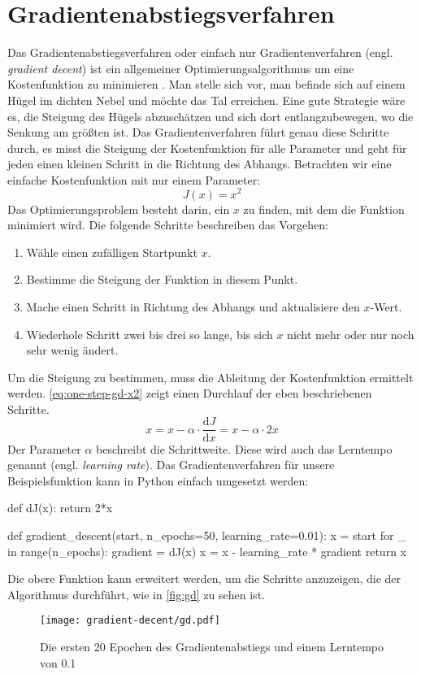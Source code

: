 \chapter{Gradientenabstiegsverfahren}
\label{appx:gradient-descent}
Das Gradientenabstiegsverfahren oder einfach nur Gradientenverfahren
(engl. \textit{gradient decent})
ist ein allgemeiner Optimierungsalgorithmus
um eine Kostenfunktion zu minimieren \parencite[118]{book:hands-on-ml}.
Man stelle sich vor, man befinde sich auf einem Hügel im dichten Nebel
und möchte das Tal erreichen.
Eine gute Strategie wäre es, die Steigung des
Hügels abzuschätzen und sich dort entlangzubewegen,
wo die Senkung am größten ist.
Das Gradientenverfahren führt genau diese Schritte durch,
es misst die Steigung der Kostenfunktion für alle Parameter
und geht für jeden einen kleinen Schritt in die Richtung des Abhangs.
Betrachten wir eine einfache Kostenfunktion
mit nur einem Parameter:
\begin{equation*}
  J(x) = x^2 
\end{equation*}
Das Optimierungsproblem besteht darin, ein $x$ zu finden, mit dem die Funktion minimiert wird.
Die folgende Schritte beschreiben das Vorgehen:
\begin{enumerate}
  \item Wähle einen zufälligen Startpunkt $x$.
  \item Bestimme die Steigung der Funktion in diesem Punkt.
  \item Mache einen Schritt in Richtung des Abhangs und aktualisiere den $x$-Wert.
  \item Wiederhole Schritt zwei bis drei so lange,
        bis sich $x$ nicht mehr oder nur noch sehr wenig ändert.
\end{enumerate}
Um die Steigung zu bestimmen, muss die Ableitung der Kostenfunktion ermittelt werden.
\autoref{eq:one-step-gd-x2} zeigt einen Durchlauf der eben beschriebenen Schritte.
\begin{equation}
  x = x - \alpha \cdot \frac{\mathrm{d}J}{\mathrm{d}x} = x - \alpha \cdot 2x
  \label{eq:one-step-gd-x2}
\end{equation}
Der Parameter $\alpha$ beschreibt die Schrittweite. Diese wird auch das
Lerntempo genannt (engl. \textit{learning rate}).
Das Gradientenverfahren für unsere Beispielsfunktion kann in Python 
einfach umgesetzt werden:
\begin{pythoncode}
def dJ(x):
    return 2*x

def gradient_descent(start, n_epochs=50, learning_rate=0.01):
    x = start
    for _ in range(n_epochs):
        gradient = dJ(x)
        x = x - learning_rate * gradient
    return x
\end{pythoncode}
Die obere Funktion kann erweitert werden, um die Schritte anzuzeigen,
die der Algorithmus durchführt, wie in \autoref{fig:gd} zu sehen ist.
\begin{figure}[h!]
  \centering
  \texttt{[image: gradient-decent/gd.pdf]}
  \caption{Die ersten 20 Epochen des Gradientenabstiegs und einem Lerntempo von \num{0.1}}
  \label{fig:gd}
\end{figure}

